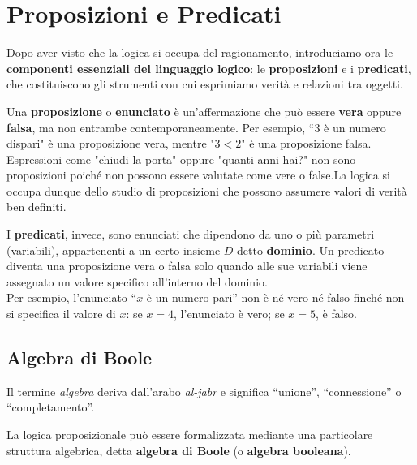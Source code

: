 \section{Proposizioni e Predicati }
Dopo aver visto che la logica si occupa del ragionamento, introduciamo ora le \textbf{componenti essenziali del linguaggio logico}: le \textbf{proposizioni} e i \textbf{predicati}, che costituiscono gli strumenti con cui esprimiamo verità e relazioni tra oggetti.
\medskip

\noindent Una \textbf{proposizione}  o \textbf{enunciato} è un'affermazione che può essere \textbf{vera} oppure \textbf{falsa}, ma non entrambe contemporaneamente.
Per esempio, “$3$ è un numero dispari" è una proposizione vera, mentre "$3<2$" è una proposizione falsa. Espressioni come "chiudi la porta" oppure "quanti anni hai?" non sono proposizioni poiché non possono essere valutate come vere o false.La logica si occupa dunque dello studio di proposizioni  che possono assumere valori di verità ben definiti.
\medskip

I \textbf{predicati}, invece,  sono enunciati che dipendono da uno o più parametri (variabili), appartenenti a un certo insieme $D$ detto \textbf{dominio}. 
Un predicato diventa una proposizione vera o falsa solo quando alle sue variabili viene assegnato un valore specifico all'interno del dominio.
\\

Per esempio, l'enunciato “$x$ è un numero pari” non è né vero né falso finché non si specifica il valore di $x$:  
se $x=4$, l'enunciato è vero; se $x=5$, è falso.

\subsection{Algebra di Boole}
Il termine \textit{algebra} deriva dall'arabo \textit{al-jabr} e significa “unione”, “connessione” o “completamento”. 
\medskip

\noindent La logica proposizionale pu\`o essere formalizzata mediante una particolare struttura algebrica, detta \textbf{algebra di Boole} (o \textbf{algebra booleana}).
\medskip


